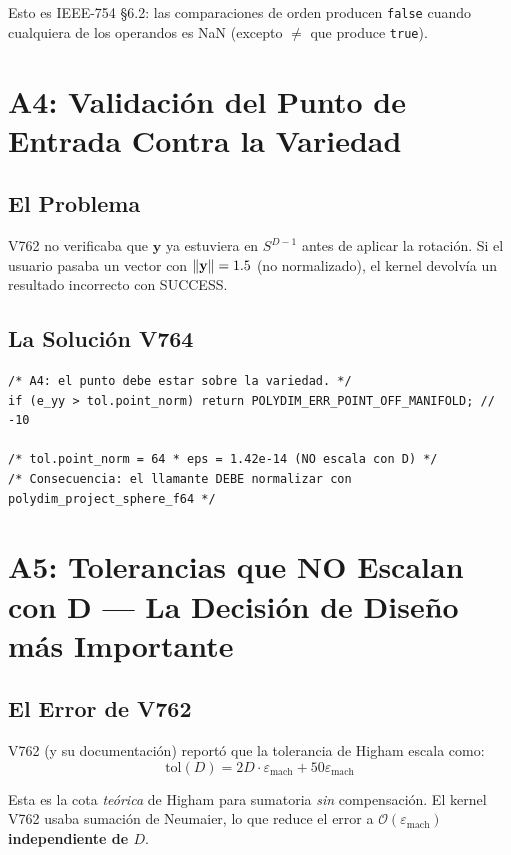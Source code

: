 Esto es IEEE-754 §6.2: las comparaciones de orden producen \texttt{false} cuando
cualquiera de los operandos es NaN (excepto $\ne$ que produce \texttt{true}).

\section{A4: Validación del Punto de Entrada Contra la Variedad}

\subsection{El Problema}

V762 no verificaba que $\mathbf{y}$ ya estuviera en $S^{D-1}$ antes de aplicar la rotación.
Si el usuario pasaba un vector con $\norm{\mathbf{y}} = 1.5$ (no normalizado), el kernel
devolvía un resultado incorrecto con SUCCESS.

\subsection{La Solución V764}

\begin{lstlisting}[style=cppstyle, caption={Validación del punto de entrada --- A4}, label=lst:point_manifold]
/* A4: el punto debe estar sobre la variedad. */
if (e_yy > tol.point_norm) return POLYDIM_ERR_POINT_OFF_MANIFOLD; // -10

/* tol.point_norm = 64 * eps = 1.42e-14 (NO escala con D) */
/* Consecuencia: el llamante DEBE normalizar con polydim_project_sphere_f64 */
\end{lstlisting}

\section{A5: Tolerancias que NO Escalan con D --- La Decisión de Diseño más Importante}

\subsection{El Error de V762}

V762 (y su documentación) reportó que la tolerancia de Higham escala como:
\begin{equation}
\text{tol}(D) = 2D \cdot \varepsilon_{\text{mach}} + 50\varepsilon_{\text{mach}}
\end{equation}

Esta es la cota \textit{teórica} de Higham para sumatoria \textit{sin} compensación.
El kernel V762 usaba sumación de Neumaier, lo que reduce el error a
$\mathcal{O}(\varepsilon_{\text{mach}})$ \textbf{independiente de $D$}.

